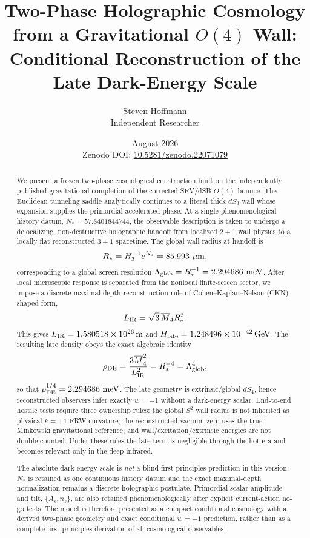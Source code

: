 \documentclass[11pt]{article}
\title{\textbf{Two-Phase Holographic Cosmology from a Gravitational $O(4)$ Wall:}\\
Conditional Reconstruction of the Late Dark-Energy Scale}
\author{Steven Hoffmann\\Independent Researcher}
\date{August 2026\\\small Zenodo DOI: \href{https://doi.org/10.5281/zenodo.22071079}{10.5281/zenodo.22071079}}
\newcommand{\Mbar}{\overline M_4}
\newcommand{\Rstar}{R_*}
\newcommand{\Nstar}{N_*}
\newcommand{\LIR}{L_{\rm IR}}
\newcommand{\Hlate}{H_{\rm late}}
\newcommand{\rhode}{\rho_{\rm DE}}
\newcommand{\Lglob}{\Lambda_{\rm glob}}
\begin{document}
\maketitle

\begin{abstract}
We present a frozen two-phase cosmological construction built on the independently published gravitational completion of the corrected SFV/dSB $O(4)$ bounce.  The Euclidean tunneling saddle analytically continues to a literal thick $dS_3$ wall whose expansion supplies the primordial accelerated phase.  At a single phenomenological history datum, $\Nstar=57.8401844744$, the observable description is taken to undergo a delocalizing, non-destructive holographic handoff from localized $2+1$ wall physics to a locally flat reconstructed $3+1$ spacetime.  The global wall radius at handoff is
\[
\Rstar=H_3^{-1}e^{\Nstar}=85.993~\mu{\rm m},
\]
corresponding to a global screen resolution $\Lglob=\Rstar^{-1}=2.294686~{\rm meV}$.  After local microscopic response is separated from the nonlocal finite-screen sector, we impose a discrete maximal-depth reconstruction rule of Cohen--Kaplan--Nelson (CKN)-shaped form,
\[
\LIR=\sqrt3\,\Mbar\Rstar^2.
\]
This gives $\LIR=1.580518\times10^{26}\,{\rm m}$ and $\Hlate=1.248496\times10^{-42}\,{\rm GeV}$.  The resulting late density obeys the exact algebraic identity
\[
\rhode=\frac{3\Mbar^2}{\LIR^2}=\Rstar^{-4}=\Lglob^4,
\]
so that $\rhode^{1/4}=2.294686~{\rm meV}$.  The late geometry is extrinsic/global $dS_4$, hence reconstructed observers infer exactly $w=-1$ without a dark-energy scalar.  End-to-end hostile tests require three ownership rules: the global $S^2$ wall radius is not inherited as physical $k=+1$ FRW curvature; the reconstructed vacuum zero uses the true-Minkowski gravitational reference; and wall/excitation/extrinsic energies are not double counted.  Under these rules the late term is negligible through the hot era and becomes relevant only in the deep infrared.

The absolute dark-energy scale is \emph{not} a blind first-principles prediction in this version: $\Nstar$ is retained as one continuous history datum and the exact maximal-depth normalization remains a discrete holographic postulate.  Primordial scalar amplitude and tilt, $\{A_s,n_s\}$, are also retained phenomenologically after explicit current-action no-go tests.  The model is therefore presented as a compact conditional cosmology with a derived two-phase geometry and exact conditional $w=-1$ prediction, rather than as a complete first-principles derivation of all cosmological observables.
\end{abstract}
\end{document}
